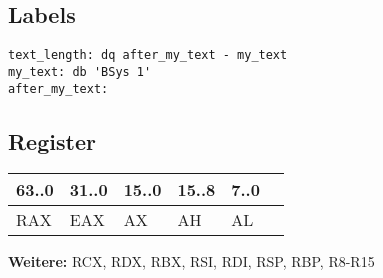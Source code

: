 \begin{multicols*}{4}
\subsection{Labels}
\begin{lstlisting}[language={[x86masm]Assembler}]
text_length: dq after_my_text - my_text
my_text: db 'BSys 1'
after_my_text:
\end{lstlisting}

\subsection{Register}
\begin{tabular}{llllll}
    63..0 & 31..0 & 15..0 & 15..8 & 7..0\\
    \hline
    RAX & EAX & AX & AH & AL\\
\end{tabular}

\textbf{Weitere:} RCX, RDX, RBX, RSI, RDI, RSP, RBP, R8-R15


\end{multicols*}
